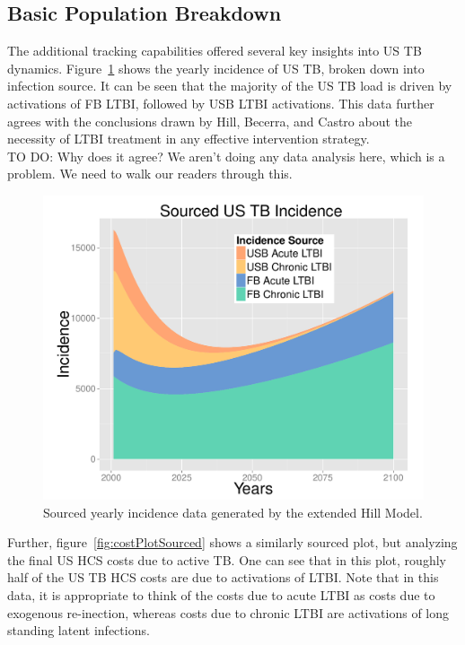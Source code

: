 \documentclass{amsart}
\newcommand{\TODO}[1]{\hfill\\{\huge \color{red} TO DO:} #1 \hfill \\}
\begin{document}
\subsection{Basic Population Breakdown}
The additional tracking capabilities offered several key insights into US TB
dynamics. Figure~\ref{fig:incPlotSourced} shows the yearly incidence of US TB, broken
down into infection source. It can be seen that the majority of the US TB load
is driven by activations of FB LTBI, followed by USB LTBI activations. This data
further agrees with the conclusions drawn by Hill, Becerra, and Castro about the
necessity of LTBI treatment in any effective intervention strategy. 
\TODO{Why does it agree? We aren't doing any data analysis here, which is a
problem. We need to walk our readers through this.}
\begin{figure}[h]
  \begin{center}
    \includegraphics[scale=.5]{incPlotSourced}
  \end{center}
  \caption{Sourced yearly incidence data generated by the extended Hill Model.}
  \label{fig:incPlotSourced}
\end{figure}
Further, figure~\ref{fig:costPlotSourced} shows a similarly sourced plot, but analyzing the
final US HCS costs due to active TB. One can see that in this plot, roughly half
of the US TB HCS costs are due to activations of LTBI. Note that in this data,
it is appropriate to think of the costs due to acute LTBI as costs due to
exogenous re-inection, whereas costs due to chronic LTBI are activations of long
standing latent infections. 
\end{document}
